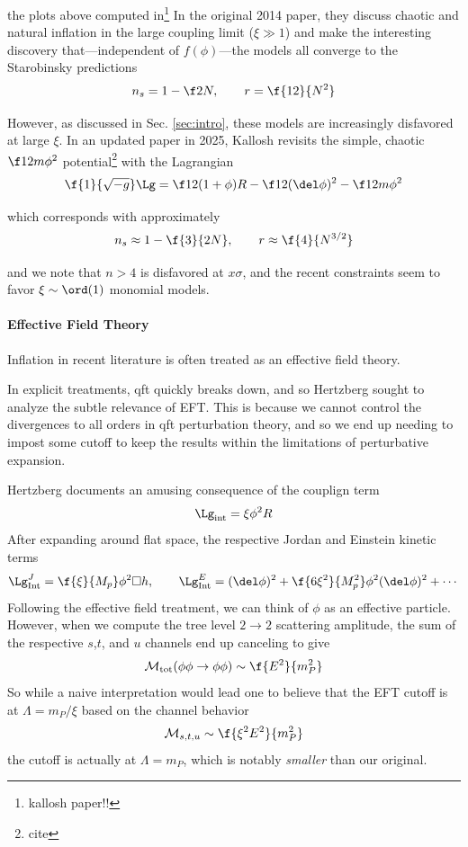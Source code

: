 the plots above computed in\footnote{kallosh paper!!} In the original 2014 paper, they discuss chaotic and natural inflation in the large coupling limit ($\xi\gg1$) and make the interesting discovery that—independent of $f(\phi)$—the models all converge to the Starobinsky predictions
\begin{equation}
    n_s=1-\f2N, \qquad r=\f{12}{N^2}
\end{equation}

However, as discussed in Sec. \ref{sec:intro}, these models are increasingly disfavored at large $\xi$. In an updated paper in 2025, Kallosh revisits the simple, chaotic $\f12m\phi^2$ potential\footnote{cite} with the Lagrangian
\begin{equation}
    \f{1}{\sqrt{-g}}\Lg=\f12(1+\phi)R-\f12(\del\phi)^2-\f12m\phi^2
\end{equation}

which corresponds with approximately
\begin{equation}
    n_s\approx 1-\f{3}{2N}, \qquad r\approx \f{4}{N^{3/2}}
\end{equation}

and we note that $n>4$ is disfavored at $x\sigma$, and the recent constraints seem to favor $\xi\sim\ord(1)$ monomial models.


\paragraph{Effective Field Theory}


Inflation in recent literature is often treated as an effective field theory. 

In explicit treatments,  qft quickly breaks down, and so Hertzberg\cite{Hertzberg2010NMC}  sought to analyze the subtle relevance of EFT. This is because we cannot control the divergences to all orders in qft perturbation theory, and so we end up needing to impost some cutoff to keep the results within the limitations of perturbative expansion.

Hertzberg documents an amusing consequence of the couplign term
$$
\Lg_{\rm int}=\xi\phi^2R
$$
After expanding around flat space, the respective Jordan and Einstein kinetic terms
\begin{equation}
    \Lg^J_{\rm Int}=\f{\xi}{M_p}\phi^2\Box h, \qquad \Lg^E_{\rm Int}=(\del\phi)^2+\f{6\xi^2}{M^2_p}\phi^2(\del\phi)^2+\cdots
\end{equation}
Following the effective field treatment, we can think of $\phi$ as an effective particle. However, when we compute the tree level $2\to2$ scattering amplitude, the sum of the respective $s$,$t$, and $u$ channels end up canceling to give
\[
\mathcal{M}_{\rm tot}(\phi\phi\to\phi\phi)\sim\f{E^2}{m_P^2}
\]
So while a naive interpretation would lead one to believe that the EFT cutoff is at $\Lambda=m_P/\xi$ based on the channel behavior
\[
\mathcal{M}_{s,t,u}\sim \f{\xi^2E^2}{m_P^2}
\]
the cutoff is actually at  $\Lambda=m_P$, which is notably \textit{smaller} than our original. 

